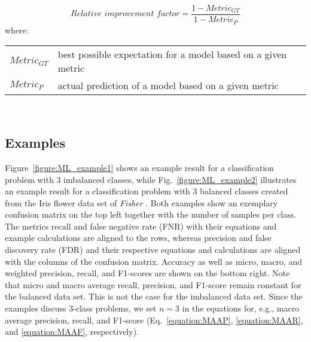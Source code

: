 \documentclass{article}
\makeatletter
\newenvironment{conditions}[1][where:]
	{\hspace{0.02\textwidth} #1 \begin{tabular}[t]{>{$}l<{$} @{${}={}$} l}}
	{\end{tabular}\\[\belowdisplayskip]}
\makeatother
\begin{document}
\begin{equation}
	\textit{Relative improvement factor} = \dfrac{1 - \textit{Metric}_{\textit{GT}}}{1 - \textit{Metric}_P}
%
	\label{equation:relative_improvement_factor}
\end{equation}
%
\begin{conditions}
	\textit{Metric}_{\textit{GT}} & best possible expectation for a model based on a given metric \\
	\textit{Metric}_P             & actual prediction of a model based on a given metric
\end{conditions}




\clearpage




\subsection{Examples}

Figure~\ref{figure:ML_example1} shows an example result for a classification problem with 3 imbalanced classes, while Fig.~\ref{figure:ML_example2} illustrates an example result for a classification problem with 3 balanced classes created from the Iris flower data set of \textit{Fisher} \cite{fisher1936use}. Both examples show an exemplary confusion matrix on the top left together with the number of samples per class. The metrics recall and false negative rate (FNR) with their equations and example calculations are aligned to the rows, whereas precision and false discovery rate (FDR) and their respective equations and calculations are aligned with the columns of the confusion matrix. Accuracy as well as micro, macro, and weighted precision, recall, and F1-scores are shown on the bottom right. Note that micro and macro average recall, precision, and F1-score remain constant for the balanced data set. This is not the case for the imbalanced data set. Since the examples discuss 3-class problems, we set $n = 3$ in the equations for, e.g., macro average precision, recall, and F1-score (Eq.~\ref{equation:MAAP}, \ref{equation:MAAR}, and \ref{equation:MAAF}, respectively).
\end{document}
